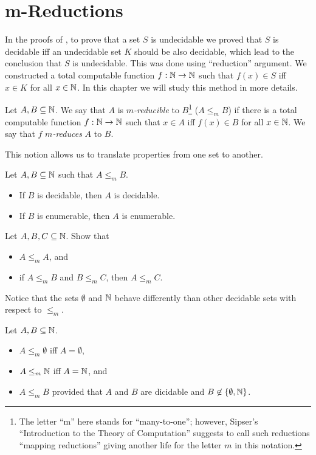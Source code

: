 \chapter{m-Reductions}
In the proofs of , to prove
that a set $S$ is undecidable we proved that $S$ is decidable iff an undecidable
set $K$ should be also decidable, which lead to the conclusion that $S$ is
undecidable. This was done using ``reduction'' argument. We constructed a total
computable function $f : {\mathbb{N}} \to {\mathbb{N}}$ such that $f(x) \in S$ iff $x \in K$ for all
$x \in {\mathbb{N}}$. In
this chapter we will study this method in more details.

\begin{definition}
  Let $A, B \subseteq {\mathbb{N}}$. We say that $A$ is \emph{$m$-reducible} to
  $B$\footnote{%
    The letter ``m'' here stands for ``many-to-one''; however, Sipser's
    ``Introduction to the Theory of Computation'' suggests to call such
    reductions ``mapping reductions'' giving another life for the letter $m$ in
    this notation.
  }
  ($A \le_m B$) if there is a total computable function $f : {\mathbb{N}} \to {\mathbb{N}}$ such
  that $x \in A$ iff $f(x) \in B$ for all $x \in {\mathbb{N}}$. We say that $f$
  \emph{$m$-reduces} $A$ to $B$.
\end{definition}

This notion allows us to translate properties from one set to another.
\begin{theorem}
  Let $A, B \subseteq {\mathbb{N}}$ such that $A \le_m B$.
  \begin{itemize}
    \item If $B$ is decidable, then $A$ is decidable.
    \item If $B$ is enumerable, then $A$ is enumerable.
  \end{itemize}
\end{theorem}

\begin{exercise}
  Let $A, B, C \subseteq {\mathbb{N}}$. Show that
  \begin{itemize}
    \item $A \le_m A$, and 
    \item if $A \le_m B$ and $B \le_m C$, then $A \le_m C$.
  \end{itemize}
\end{exercise}

Notice that the sets $\emptyset$ and ${\mathbb{N}}$ behave differently than other
decidable sets with respect to $\le_m$.
\begin{remark}
  Let $A, B \subseteq {\mathbb{N}}$.
  \begin{itemize}
    \item $A \le_m \emptyset$ iff $A = \emptyset$, 
    \item $A \le_m {\mathbb{N}}$ iff $A = {\mathbb{N}}$, and
    \item $A \le_m B$ provided that $A$ and $B$ are dicidable and $B \not\in
      \set{\emptyset, \N}$.
  \end{itemize}
\end{remark}

